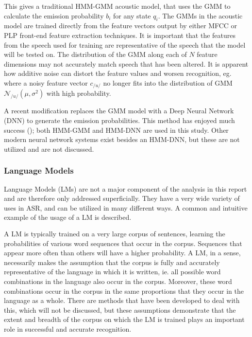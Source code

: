 This gives a traditional HMM-GMM acoustic model, that uses the GMM to calculate the emission probability $b_i$ for any state $q_i$.  The GMMs in the acoustic model are trained directly from the feature vectors output by either MFCC or PLP front-end feature extraction techniques.  It is important that the features from the speech used for training are representative of the speech that the model will be tested on.  The distribution of the GMM along each of $N$ feature dimensions may not accurately match speech that has been altered.  It is apparent how additive noise can distort the feature values and worsen recognition, eg. where a noisy feature vector $c_{/u/}$ no longer fits into the distribution of GMM $\mathcal{N}_{/u/}(\mu,\sigma^2)$ with high probability.

A recent modification replaces the GMM model with a Deep Neural Network (DNN) to generate the emission probabilities. This method has enjoyed much success (\cite{zhang:17}); both HMM-GMM and HMM-DNN are used in this study.  Other modern neural network systems exist besides an HMM-DNN, but these are not utilized and are not discussed.





\subsubsection{Language Models}

Language Models (LMs) are not a major component of the analysis in this report and are therefore only addressed superficially.  They have a very wide variety of uses in ASR, and can be utilized in many different ways.  A common and intuitive example of the usage of a LM is described.

A LM is typically trained on a very large corpus of sentences, learning the probabilities of various word sequences that occur in the corpus.  Sequences that appear more often than others will have a higher probability.  A LM, in a sense, necessarily makes the assumption that the corpus is fully and accurately representative of the language in which it is written, ie. all possible word combinations in the language also occur in the corpus. Moreover, these word combinations occur in the corpus in the same proportions that they occur in the language as a whole.  There are methods that have been developed to deal with this, which will not be discussed, but these assumptions demonstrate that the extent and breadth of the corpus on which the LM is trained plays an important role in successful and accurate recognition.  


